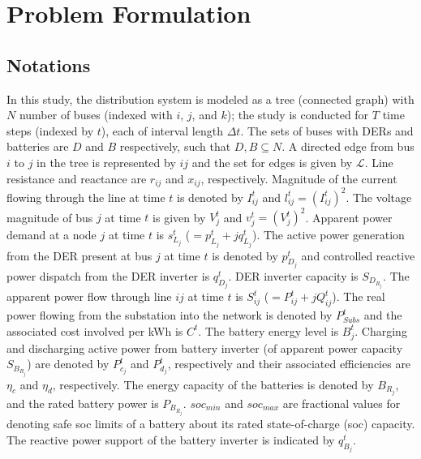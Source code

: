 \documentclass[../../outputs/main.tex]{subfiles}
\begin{document}
\section{Problem Formulation}

\subsection{Notations}
In this study, the distribution system is modeled as a tree (connected graph) with $N$ number of buses (indexed with \(i\), \(j\), and \(k\)); the study is conducted for $T$ time steps (indexed by $t$), each of interval length $\Delta t$. The sets of buses with DERs and batteries are $D$ and $B$ respectively, such that $D, B \subseteq N$.
A directed edge from bus $i$ to $j$ in the tree is represented by $ij$ and the set for edges is given by $\mathcal{L}$. Line resistance and reactance are \(r_{ij}\) and \(x_{ij}\), respectively. Magnitude of the current flowing through the line at time \(t\) is denoted by \(I_{ij}^t\) and  $l_{ij}^t=\left(I_{ij}^t\right)^2$. The voltage magnitude of bus \(j\) at time \(t\) is given by \(V_j^t\) and  $v_j^t=\left(V_j^t\right)^2$. Apparent power demand at a node \(j\) at time \(t\) is \(s^t_{L_j}\) (\(=p^t_{L_j}+\textit{j}q^t_{L_j}\)). The active power generation from the DER present at bus \(j\) at time \(t\) is denoted by \(p^t_{D_j}\) and controlled reactive power dispatch from the DER inverter is \(q^t_{D_j}\). DER inverter capacity is $S_{D_{R_j}}$.
The apparent power flow through line {\(ij\)} at time \(t\) is \(S_{ij}^t\) (\(=P_{ij}^t+\textit{j}Q_{ij}^t\)). The real power flowing from the substation into the network is denoted by $P^t_{Subs}$ and the associated cost involved per kWh is $C^t$. The battery energy level is \(B_j^t\). Charging and discharging active power from battery inverter (of apparent power capacity $S_{B_{R_j}}$) are denoted by \(P_{c_j}^t\) and \(P_{d_j}^t\), respectively and their associated efficiencies are $\eta_c$ and $\eta_d$, respectively. The energy capacity of the batteries is denoted by $B_{R_j}$, and the rated battery power is $P_{B_{R_j}}$. $soc_{min}$ and $soc_{max}$ are fractional values for denoting safe soc limits of a battery about its rated state-of-charge (soc) capacity. The reactive power support of the battery inverter is indicated by \(q_{B_j}^t\). 
\end{document}
